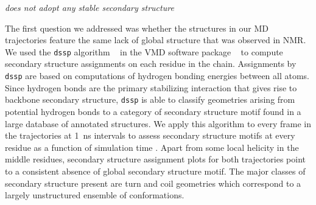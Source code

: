 
{\it \gct does not adopt any stable secondary structure}


The first question we addressed was whether the structures in our MD trajectories feature the same lack of global structure that was observed in NMR. We used the \texttt{dssp} algorithm ~\cite{kabsch1983dictionary} in the VMD software package ~\cite{humphrey1996vmd} to compute secondary structure assignments on each residue in the chain. Assignments by \texttt{dssp} are based on computations of hydrogen bonding energies between all atoms. Since hydrogen bonds are the primary stabilizing interaction that gives rise to backbone secondary structure, \texttt{dssp} is able to classify geometries arising from potential hydrogen bonds to a category of secondary structure motif found in a large database of annotated structures. We apply this algorithm to every frame in the trajectories at \SI{1}{\ns} intervals to assess secondary structure motifs at every residue as a function of simulation time . Apart from some local helicity in the middle residues, secondary structure assignment plots for both trajectories point to a consistent absence of global secondary structure motif. The major classes of secondary structure present are turn and coil geometries which correspond to a largely unstructured ensemble of conformations. 

\begin{figure}
	\centering     %
	\subfigure[WT]{\label{fig:ss_a}\texttt{[image: wt\_ss]}}
	\subfigure[YD]{\label{fig:ss_b}\texttt{[image: yd\_ss]}}
	\label{fig:ss}
\end{figure}	


